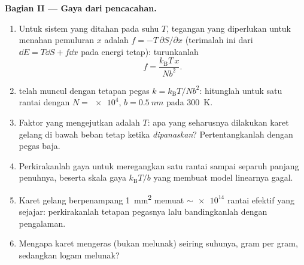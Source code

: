 \begin{problem}
\medskip\noindent\textbf{Bagian II --- Gaya dari pencacahan.}
\begin{enumerate}[resume]
  \item Untuk sistem yang ditahan pada suhu $T$, tegangan yang
        diperlukan untuk menahan pemuluran $x$ adalah
        $f = -T\,\partial S/\partial x$
        (terimalah ini dari $\dd E = T\dd S + f\dd x$ pada energi tetap):
        turunkanlah
        \[
        f = \frac{k_{\text{B}}T\,x}{Nb^2} .
        \]
  \item {} telah muncul dengan tetapan pegas $k =
        k_{\text{B}}T/Nb^2$: hitunglah untuk satu rantai dengan $N =
        \num{e4}$, $b = \qty{0.5}{nm}$ pada \qty{300}{K}.
  \item Faktor yang mengejutkan adalah $T$: apa yang seharusnya
        dilakukan karet gelang di bawah beban tetap ketika
        \emph{dipanaskan}? Pertentangkanlah dengan pegas baja.
  \item Perkirakanlah gaya untuk meregangkan satu rantai sampai separuh
        panjang penuhnya, beserta skala gaya $k_{\text{B}}T/b$ yang
        membuat model linearnya gagal.
  \item Karet gelang berpenampang \qty{1}{mm^2} memuat
        $\sim\num{e14}$ rantai efektif yang sejajar: perkirakanlah
        tetapan pegasnya lalu bandingkanlah dengan pengalaman.
  \item Mengapa karet mengeras (bukan melunak) seiring suhunya, gram per
        gram, sedangkan logam melunak?
\end{enumerate}


\end{problem}

